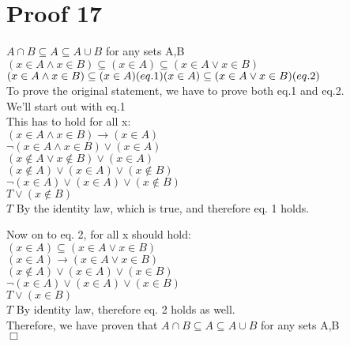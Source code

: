 \documentclass{article}
\begin{document}
\section{Proof 17}
$A \cap B \subseteq A \subseteq A \cup B$ for any sets A,B\\
$(x \in A \land x \in B) \subseteq (x \in A) \subseteq (x \in A \lor x \in B)$\\
$(x \in A \land x \in B) \subseteq (x \in A)  (eq. 1)\\
(x \in A) \subseteq (x \in A \lor x \in B) (eq. 2)$\\
To prove the original statement, we have to prove both eq.1 and eq.2.\\
We'll start out with eq.1\\
This has to hold for all x:\\
$(x \in A \land x \in B) \rightarrow (x \in A)$\\
$\neg(x \in A \land x \in B) \lor (x \in A)$\\
$(x \not\in A \lor x \not\in B) \lor (x \in A)$\\
$(x \not\in A) \lor (x \in A) \lor (x \not\in B)$\\
$\neg(x \in A) \lor (x \in A) \lor (x \not\in B)$\\
$T \lor (x \not \in B)$ \\
$T$ By the identity law, which is true, and therefore eq. 1 holds.

Now on to eq. 2, for all x should hold:\\
$(x \in A) \subseteq (x \in A \lor x \in B)$\\
$(x \in A) \rightarrow (x \in A \lor x \in B)$\\
$(x \not\in A) \lor (x \in A) \lor (x \in B)$\\
$\neg(x \in A) \lor (x \in A) \lor (x \in B)$\\
$T \lor (x \in B)$\\
$T$ By identity law, therefore eq. 2 holds as well.\\
Therefore, we have proven that $A \cap B \subseteq A \subseteq A \cup B$ for any sets A,B\\
$\Box$
\end{document}
